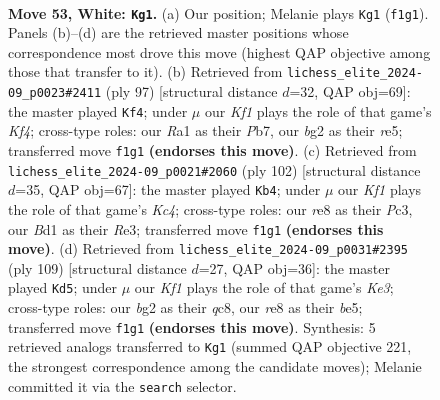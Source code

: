 \documentclass[11pt]{article}
\begin{document}
\clearpage

\begin{figure}[p]\centering
\begin{subfigure}{0.46\textwidth}\centering
\resizebox{\linewidth}{!}{%
\newchessgame
\chessboard[
  setfen={4r3/5p1k/6p1/1R6/7P/1P6/2Pr2b1/R2B1K2 w - - 1 53},
  showmover=false,
  pgfstyle=straightmove, color=movearrow, markmove={f1-g1}
]}
\caption{}
\end{subfigure}\hfill
\begin{subfigure}{0.46\textwidth}\centering
\resizebox{\linewidth}{!}{%
\newchessgame
\chessboard[
  setfen={8/1p6/p7/1b2Rk2/8/1PBr2pP/6P1/6K1 b - - 6 49},
  showmover=false,
  pgfstyle=straightmove, color=movearrow, markmove={f5-f4}
]}
\caption{}
\end{subfigure}
\\[4pt]
\begin{subfigure}{0.46\textwidth}\centering
\resizebox{\linewidth}{!}{%
\newchessgame
\chessboard[
  setfen={4B3/p7/1k3p1n/2r1b2P/2K5/2P1R3/8/8 w - - 4 52},
  showmover=false,
  pgfstyle=straightmove, color=movearrow, markmove={c4-b4}
]}
\caption{}
\end{subfigure}\hfill
\begin{subfigure}{0.46\textwidth}\centering
\resizebox{\linewidth}{!}{%
\newchessgame
\chessboard[
  setfen={2Q5/7R/1K2k3/4B3/1P1P2p1/P4b2/5r1p/8 b - - 0 55},
  showmover=false,
  pgfstyle=straightmove, color=movearrow, markmove={e6-d5}
]}
\caption{}
\end{subfigure}
\caption{\textbf{Move 53, White: \texttt{Kg1}.} (a) Our position; Melanie plays \texttt{Kg1} (\texttt{f1g1}). Panels (b)--(d) are the retrieved master positions whose correspondence most drove this move (highest QAP objective among those that transfer to it). (b) Retrieved from \texttt{lichess\_elite\_2024-09\_p0023\#2411} (ply 97) [structural distance $d$=32, QAP obj=69]: the master played \texttt{Kf4}; under $\mu$ our \emph{Kf1} plays the role of that game's \emph{Kf4}; cross-type roles: our \emph{R}a1 as their \emph{P}b7, our \emph{b}g2 as their \emph{r}e5; transferred move \texttt{f1g1} \textbf{(endorses this move)}. (c) Retrieved from \texttt{lichess\_elite\_2024-09\_p0021\#2060} (ply 102) [structural distance $d$=35, QAP obj=67]: the master played \texttt{Kb4}; under $\mu$ our \emph{Kf1} plays the role of that game's \emph{Kc4}; cross-type roles: our \emph{r}e8 as their \emph{P}c3, our \emph{B}d1 as their \emph{R}e3; transferred move \texttt{f1g1} \textbf{(endorses this move)}. (d) Retrieved from \texttt{lichess\_elite\_2024-09\_p0031\#2395} (ply 109) [structural distance $d$=27, QAP obj=36]: the master played \texttt{Kd5}; under $\mu$ our \emph{Kf1} plays the role of that game's \emph{Ke3}; cross-type roles: our \emph{b}g2 as their \emph{q}c8, our \emph{r}e8 as their \emph{b}e5; transferred move \texttt{f1g1} \textbf{(endorses this move)}. Synthesis: 5 retrieved analogs transferred to \texttt{Kg1} (summed QAP objective 221, the strongest correspondence among the candidate moves); Melanie committed it via the \texttt{search} selector.}
\label{fig:thought-m104}
\end{figure}
\end{document}
